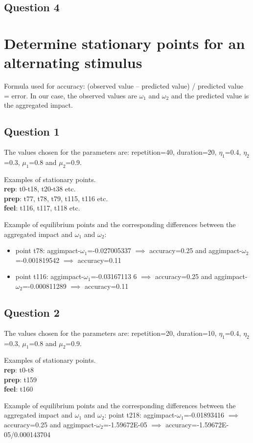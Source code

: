 \documentclass[a4paper]{article}
\begin{document}
\subsection{Question 4}

\section{Determine stationary points for an alternating stimulus}

Formula used for accuracy: (observed value – predicted value) / predicted value = error. In our case, the observed values are $\omega_{1}$ and $\omega_{2}$ and the predicted value is the aggregated impact.

\subsection{Question 1}

The values chosen for the parameters are: repetition=40, duration=20, $\eta_{1}$=0.4, $\eta_{2}$=0.3, $\mu_{1}$=0.8 and $\mu_{2}$=0.9.

Examples of stationary points. \\
\textbf{rep}: t0-t18, t20-t38 etc. \\
\textbf{prep}: t77, t78, t79, t115, t116 etc.	\\
\textbf{feel}: t116, t117, t118 etc.

Example of equilibrium points and the corresponding differences between the aggregated impact and $\omega_{1}$ and $\omega_{2}$:
\begin{itemize}
\item point t78: aggimpact-$\omega_{1}$=-0.027005337 $\implies$ accuracy=0.25 and aggimpact-$\omega_{2}$=-0.001819542 $\implies$ accuracy=0.11 
\item point t116: aggimpact-$\omega_{1}$=-0.03167113 6 $\implies$ accuracy=0.25 and aggimpact-$\omega_{2}$=-0.000811289 $\implies$ accuracy=0.11
\end{itemize}

\subsection{Question 2}

The values chosen for the parameters are: repetition=20, duration=10, $\eta_{1}$=0.4, $\eta_{2}$=0.3, $\mu_{1}$=0.8 and $\mu_{2}$=0.9.

Examples of stationary points. \\
\textbf{rep}: t0-t8 \\
\textbf{prep}: t159 	\\
\textbf{feel}: t160

Example of equilibrium points and the corresponding differences between the aggregated impact and $\omega_{1}$ and $\omega_{2}$:
point t218: aggimpact-$\omega_{1}$=-0.01893416 $\implies$ accuracy=0.25 and aggimpact-$\omega_{2}$=-1.59672E-05 $\implies$ accuracy=-1.59672E-05/0.000143704
 
\end{document}

